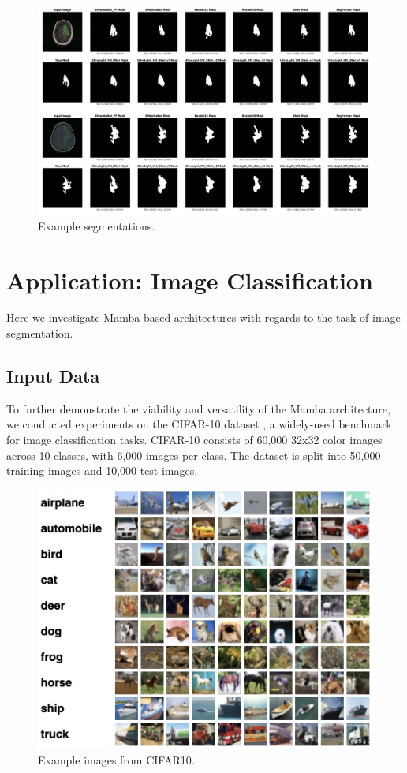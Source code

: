 \documentclass[conference]{IEEEtran}
\begin{document}
\begin{figure}[!t]
    \centering
    \includegraphics[width=\columnwidth]{imgs/masks.png}
    \caption{Example segmentations.}
    \label{fig:segs}
\end{figure}


\section{Application: Image Classification}
Here we investigate Mamba-based architectures with regards to the task of image segmentation.

\subsection{Input Data}
To further demonstrate the viability and versatility of the Mamba architecture, we conducted experiments on the CIFAR-10 dataset \cite{CIFAR-10}, a widely-used benchmark for image classification tasks. CIFAR-10 consists of 60,000 32x32 color images across 10 classes, with 6,000 images per class. The dataset is split into 50,000 training images and 10,000 test images.


\begin{figure}[!t]
    \centering
    \includegraphics[width=0.75\columnwidth]{imgs/cifar_10.jpg}
    \caption{Example images from CIFAR10.}
    \label{fig:cifar}
\end{figure}
\end{document}
